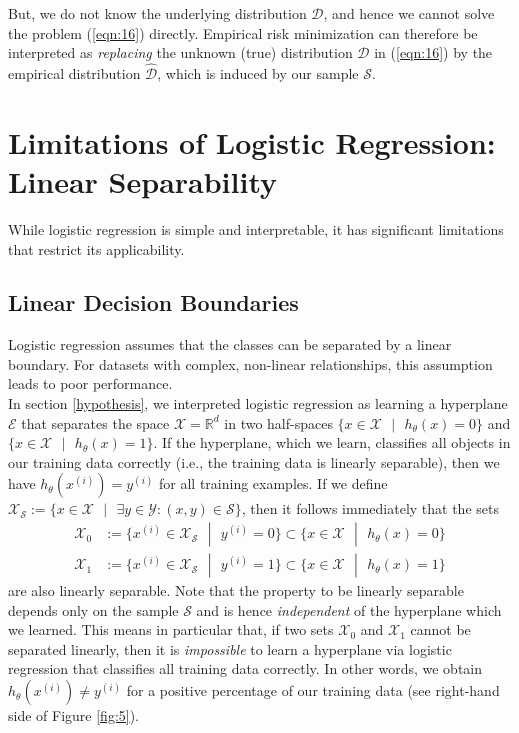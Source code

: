 But, we do not know the underlying distribution $\mathcal{D}$, and hence we cannot solve
the problem (\ref{eqn:16}) directly. Empirical risk minimization can therefore be interpreted as \emph{replacing} the unknown (true) distribution $\mathcal{D}$ in (\ref{eqn:16}) by the empirical distribution $\hat{\mathcal{D}}$, which is induced by our sample $\mathcal{S}$.


\section{Limitations of Logistic Regression: Linear Separability} \label{limitations}
While logistic regression is simple and interpretable, it has significant limitations that restrict its applicability.

\subsection{Linear Decision Boundaries}
Logistic regression assumes that the classes can be separated by a linear boundary. For datasets with complex, non-linear relationships, this assumption leads to poor performance.\\

In section \ref{hypothesis}, we interpreted logistic regression as learning a hyperplane $\mathcal{E}$ that separates the space $\mathcal{X} = \mathbb{R}^d$ in two half-spaces $\{x \in \mathcal{X}\text{ }|\text{ }h_{\theta}(x) =0 \}$ and $\{x \in \mathcal{X}\text{ }|\text{ }h_{\theta}(x) =1 \}$. If the hyperplane, which we learn, classifies all objects in our training data correctly (i.e., the training data is linearly separable), then we have $h_{\theta}(x^{(i)})=y^{(i)}$ for all training examples. If we define $\mathcal{X}_{\mathcal{S}} := \{x \in \mathcal{X}\text{ }|\text{ }\exists y \in \mathcal{Y} : (x,y) \in \mathcal{S} \}$, then it follows immediately that the sets
\begin{equation}
    \begin{aligned}
        \mathcal{X}_0 &:= \{x^{(i)} \in \mathcal{X}_{\mathcal{S}}\text{ }|\text{ }y^{(i)}=0 \} \subset \{x \in \mathcal{X}\text{ }|\text{ }h_{\theta}(x)=0 \}\\
        \mathcal{X}_1 &:= \{x^{(i)} \in \mathcal{X}_{\mathcal{S}}\text{ }|\text{ }y^{(i)}=1 \} \subset \{x \in \mathcal{X}\text{ }|\text{ }h_{\theta}(x)=1 \}
    \end{aligned}
    \label{eqn:17}
\end{equation}
are also linearly separable. Note that the property to be linearly separable depends only on the sample $\mathcal{S}$ and is hence \emph{independent} of the hyperplane which we learned. This means in particular that, if two sets $\mathcal{X}_0$ and $\mathcal{X}_1$ cannot be separated linearly, then it is \emph{impossible} to learn a hyperplane via
logistic regression that classifies all training data correctly. In other words, we obtain $h_{\theta}(x^{(i)}) \neq y^{(i)}$ for a positive percentage of our training data (see right-hand side of Figure \ref{fig:5}).

